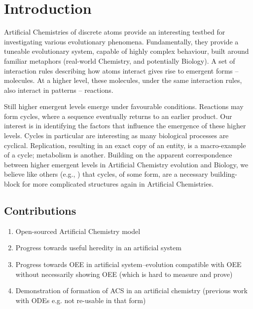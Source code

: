 \chapter{Introduction}

Artificial Chemistries of discrete atoms provide an interesting testbed
for investigating various evolutionary phenomena. Fundamentally, they
provide a tuneable evolutionary system, capable of highly complex
behaviour, built around familiar metaphors (real-world Chemistry, and
potentially Biology). A set of interaction rules describing how atoms
interact gives rise to emergent forms -- molecules. At a higher level,
these molecules, under the same interaction rules, also interact in
patterns -- reactions.


Still higher emergent levels emerge under favourable conditions.
Reactions may form cycles, where a sequence eventually returns to an
earlier product. Our interest is in identifying the factors that
influence the emergence of these higher levels. Cycles in particular are
interesting as many biological processes are cyclical. Replication,
resulting in an exact copy of an entity, is a macro-example of a cycle;
metabolism is another. Building on the apparent correspondence between
higher emergent levels in Artificial Chemistry evolution and Biology, we
believe like others (e.g., \autocite{Steel2013}) that cycles, of some
form, are a necessary building-block for more complicated structures
again in Artificial Chemistries.


\section{Contributions}

\begin{enumerate}
	\item
 Open-sourced Artificial Chemistry model
	\item
 Progress towards useful heredity in an artificial system
	\item
 Progress towards OEE in artificial system--evolution compatible with
 OEE without necessarily showing OEE (which is hard to measure and
 prove)
	\item
 Demonstration of formation of ACS in an artificial chemistry (previous
 work with ODEs e.g. \autocite{Hurndall2014} not re-usable in that form)
\end{enumerate}

